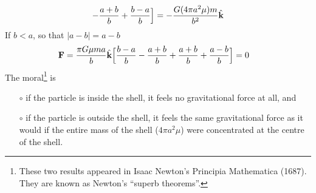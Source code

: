\begin{eg}
\begin{align*}
            -\frac{a+b}{b}
            +\frac{b-a}{b}
   \Big]
=-\frac{G(4\pi a^2\mu)m}{b^2} \hat{\mathbf{k}}
\end{align*}
If $b<a$, so that $|a-b|=a-b$
\begin{align*}
\mathbf{F}&=\frac{\pi G\mu m a}{b} \hat{\mathbf{k}}\Big[ 
      \frac{b-a}{b}
            -\frac{a+b}{b}
            +\frac{a+b}{b}
            +\frac{a-b}{b}
   \Big]
=0
\end{align*}
The moral\footnote{These two results appeared in Isaac Newton's
Principia Mathematica (1687). They are known as Newton's ``superb 
theorems''.} is
\begin{itemize}
\item[$\circ$] 
if the particle is inside the shell, it feels no gravitational force at all,
and
\item[$\circ$]
if the particle is outside the shell, it feels the same gravitational force
as it would if the entire mass of the shell ($4\pi a^2\mu$) were
concentrated at the centre of the shell.
\end{itemize}
\end{eg}

